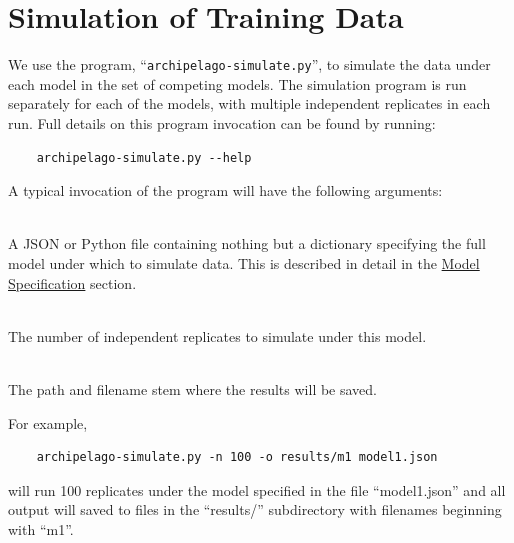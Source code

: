 \documentclass[11pt,openany]{memoir} %
\let\Item\item
\newcommand\SpecialItem{\renewcommand\item[1][]{\Item[\textbullet~\bfseries##1]}}
\begin{document}
\section{Simulation of Training Data}

We use the program, ``\texttt{archipelago-simulate.py}'', to simulate the data under each model in the set of competing models.
The simulation program is run separately for each of the models, with multiple independent replicates in each run.
Full details on this program invocation can be found by running:
\begin{lstlisting}
    archipelago-simulate.py --help
\end{lstlisting}
A typical invocation of the program will have the following arguments:
\begin{description}
    \SpecialItem
    \item[``MODEL-FILE''] \hfill \\
        A JSON or Python file containing nothing but a dictionary specifying the full model under which to simulate data. This is described in detail in the \hyperref[sec:workflow-model-specification]{Model Specification} section.
    \item[``\texttt{-n}'' or ``\texttt{--nreps}''] \hfill \\
        The number of independent replicates to simulate under this model.
    \item[``\texttt{-o}'' or ``\texttt{--output-prefix}''] \hfill \\
        The path and filename stem where the results will be saved.
\end{description}
For example,
\begin{lstlisting}
    archipelago-simulate.py -n 100 -o results/m1 model1.json
\end{lstlisting}
will run 100 replicates under the model specified in the file ``model1.json'' and all output will saved to files in the ``results/'' subdirectory with filenames beginning with ``m1''.
\end{document}
